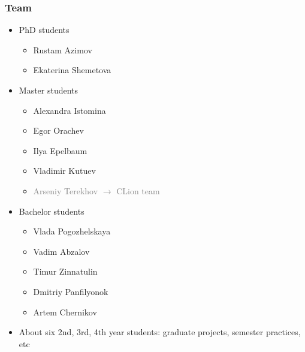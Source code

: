 \documentclass[xcolor=table, aspectratio=169]{beamer}
\begin{document}
\begin{frame}[fragile]

  \frametitle{Team}
\begin{itemize}
      \item PhD students
      \begin{itemize}
        \item Rustam Azimov
        \item Ekaterina Shemetova
      \end{itemize}
      \item Master students
      \begin{itemize}
        \item Alexandra Istomina
        \item Egor Orachev
        \item Ilya Epelbaum
        \item Vladimir Kutuev
        \item \textcolor{gray}{Arseniy Terekhov $\to$ CLion team}
      \end{itemize}
      \item Bachelor students
      \begin{itemize}
        \item Vlada Pogozhelskaya
        \item Vadim Abzalov
        \item Timur Zinnatulin
        \item Dmitriy Panfilyonok
        \item Artem Chernikov
      \end{itemize}
      \item About six 2nd, 3rd, 4th year students: graduate projects, semester practices, etc
\end{itemize}

\end{frame}
\end{document}
